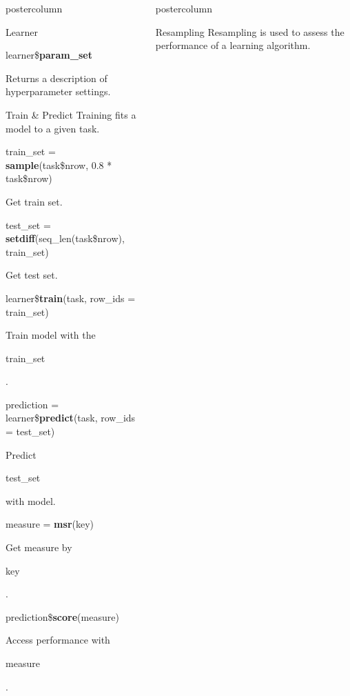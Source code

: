 \documentclass{beamer}
\newlength{\columnheight} %
\newcommand{\codeinline}[1]{\begin{codeboxinline}#1\end{codeboxinline}}
\begin{document}
\begin{frame}[fragile]{}
\begin{columns}
\begin{column}{.245\textwidth}
\begin{beamercolorbox}[center]{postercolumn}
\begin{minipage}{.98\textwidth}
{\begin{myblock}{Learner}
\begin{codebox}
								learner\$\textbf{param\_set}
							\end{codebox}
							Returns a description of hyperparameter settings.
						\end{myblock}
						\begin{myblock}{Train \& Predict}
							Training fits a model to a given task.
							\\
							\begin{codebox}
								train\_set = \textbf{sample}(task\$nrow, 0.8 * task\$nrow)
							\end{codebox}
							Get train set.
							\\
							\begin{codebox}
								test\_set = \textbf{setdiff}(seq\_len(task\$nrow), train\_set)
							\end{codebox}
							Get test set.
							\\
							\begin{codebox}
								learner\$\textbf{train}(task, row\_ids = train\_set)
							\end{codebox}
							Train model with the \codeinline{train\_set}.
							\\
							\begin{codebox}
								prediction = learner\$\textbf{predict}(task, row\_ids = test\_set)
							\end{codebox}
							Predict \codeinline{test\_set} with model.
							\\
							\begin{codebox}
								measure = \textbf{msr}(key)
							\end{codebox}
							Get measure by \codeinline{key}.
							\\
							\begin{codebox}
								prediction\$\textbf{score}(measure)
							\end{codebox}
							Access performance with \codeinline{measure}.
						\end{myblock}
					}
				\end{minipage}
			\end{beamercolorbox}
		\end{column}
		\begin{column}{.245\textwidth}
			\begin{beamercolorbox}[center]{postercolumn}
				\begin{minipage}{.98\textwidth}
					\parbox[t][\columnheight]{\textwidth}{
						\begin{myblock}{Resampling}
							Resampling is used to assess the performance of a learning algorithm.

\end{myblock}}
\end{minipage}
\end{beamercolorbox}
\end{column}
\end{columns}
\end{frame}
\end{document}
